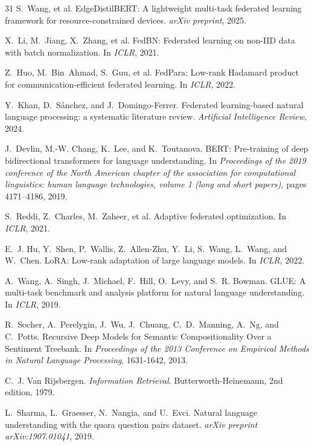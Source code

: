 \begin{thebibliography}{31}
S.~Wang, et al.
EdgeDistilBERT: A lightweight multi-task federated learning framework for resource-constrained devices.
\emph{arXiv preprint}, 2025.

X.~Li, M.~Jiang, X.~Zhang, et al.
FedBN: Federated learning on non-IID data with batch normalization.
In \emph{ICLR}, 2021.

Z.~Huo, M.~Bin~Ahmad, S.~Guu, et al.
FedPara: Low-rank Hadamard product for communication-efficient federated learning.
In \emph{ICLR}, 2022.

Y.~Khan, D.~Sánchez, and J.~Domingo-Ferrer.
Federated learning-based natural language processing: a systematic literature review.
\emph{Artificial Intelligence Review}, 2024.

J.~Devlin, M.-W. Chang, K.~Lee, and K.~Toutanova.
BERT: Pre-training of deep bidirectional transformers for language understanding.
In \emph{Proceedings of the 2019 conference of the North American chapter of the association for computational linguistics: human language technologies, volume 1 (long and short papers)}, pages 4171--4186, 2019.

S.~Reddi, Z.~Charles, M.~Zaheer, et al.
Adaptive federated optimization.
In \emph{ICLR}, 2021.

E.~J. Hu, Y.~Shen, P.~Wallis, Z.~Allen-Zhu, Y.~Li, S.~Wang, L.~Wang, and W.~Chen.
LoRA: Low-rank adaptation of large language models.
In \emph{ICLR}, 2022.

A.~Wang, A.~Singh, J.~Michael, F.~Hill, O.~Levy, and S.~R. Bowman.
GLUE: A multi-task benchmark and analysis platform for natural language understanding.
In \emph{ICLR}, 2019.

R.~Socher, A.~Perelygin, J.~Wu, J.~Chuang, C.~D.~Manning, A.~Ng, and C.~Potts.
Recursive Deep Models for Semantic Compositionality Over a Sentiment Treebank.
In \emph{Proceedings of the 2013 Conference on Empirical Methods in Natural Language Processing}, 1631-1642, 2013.

C.~J. Van Rijsbergen.
\emph{Information Retrieval}.
Butterworth-Heinemann, 2nd edition, 1979.

L.~Sharma, L.~Graesser, N.~Nangia, and U.~Evci.
Natural language understanding with the quora question pairs dataset.
\emph{arXiv preprint arXiv:1907.01041}, 2019.


\end{thebibliography}
